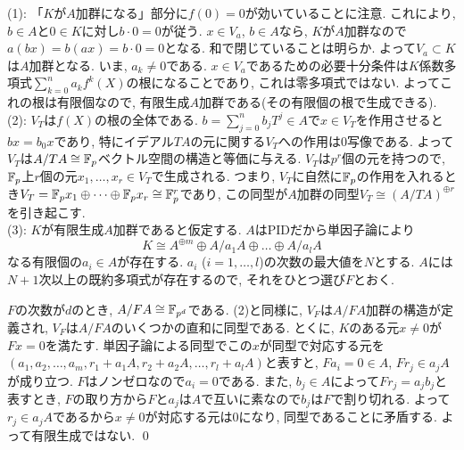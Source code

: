 \begin{probans}
(1): 「$K$が$A$加群になる」部分に$f(0)=0$が効いていることに注意. これにより, $b\in A$と$0\in K$に対し$b\cdot 0 = 0$が従う.
$x\in V_a$, $b\in A$なら, $K$が$A$加群なので$a(bx) = b(ax) = b\cdot 0 = 0$となる. 和で閉じていることは明らか. よって$V_a\subset K$は$A$加群となる. いま, $a_k\neq 0$である. $x\in V_a$であるための必要十分条件は$K$係数多項式$\sum_{k=0}^{n} a_kf^k(X)$の根になることであり, これは零多項式ではない. よってこれの根は有限個なので, 有限生成$A$加群である(その有限個の根で生成できる).\\
(2): $V_T$は$f(X)$の根の全体である. $b = \sum_{j=0}^{n} b_j T^j\in A$で$x\in V_T$を作用させると$bx = b_0x$であり,  特にイデアル$TA$の元に関する$V_T$への作用は0写像である. よって$V_T$は$A/TA \cong \mathbb{F}_{p}$ベクトル空間の構造と等価に与える. $V_T$は$p^r$個の元を持つので, $\mathbb{F}_{p}$上$r$個の元$x_1,\dots, x_r\in V_T$で生成される. つまり, $V_T$に自然に$\mathbb{F}_{p}$の作用を入れるとき$V_T = \mathbb{F}_p x_1 \oplus \dots \oplus \mathbb{F}_{p}x_r\cong \mathbb{F}_{p}^r$であり, この同型が$A$加群の同型$V_T \cong (A/TA)^{\oplus r}$を引き起こす. \\
(3): $K$が有限生成$A$加群であると仮定する. $A$はPIDだから単因子論により
\[K\cong A^{\oplus m} \oplus A/a_1A \oplus \dots \oplus A/a_l A\]
なる有限個の$a_i\in A$が存在する. $a_i$ ($i=1,\dots, l$)の次数の最大値を$N$とする. $A$には$N+1$次以上の既約多項式が存在するので, それをひとつ選び$F$とおく.

$F$の次数が$d$のとき, $A/FA \cong \mathbb{F}_{p^{d}}$である. (2)と同様に, $V_{F}$は$A/F A$加群の構造が定義され, $V_{F}$は$A/FA$のいくつかの直和に同型である. とくに, $K$のある元$x\neq 0$が$Fx = 0$を満たす. 単因子論による同型でこの$x$が同型で対応する元を$(a_1,a_2,\dots, a_m, r_1 + a_1A,r_2 + a_2A,\dots, r_l + a_lA)$と表すと, $Fa_i = 0\in A$, $Fr_j\in a_jA$が成り立つ.  $F$はノンゼロなので$a_i = 0$である. また, $b_j \in A$によって$Fr_j = a_j b_j$と表すとき, $F$の取り方から$F$と$a_j$は$A$で互いに素なので$b_j$は$F$で割り切れる. よって$r_j \in a_j A$であるから$x\neq 0$が対応する元は$0$になり, 同型であることに矛盾する. よって有限生成ではない. \qed
\end{probans}

